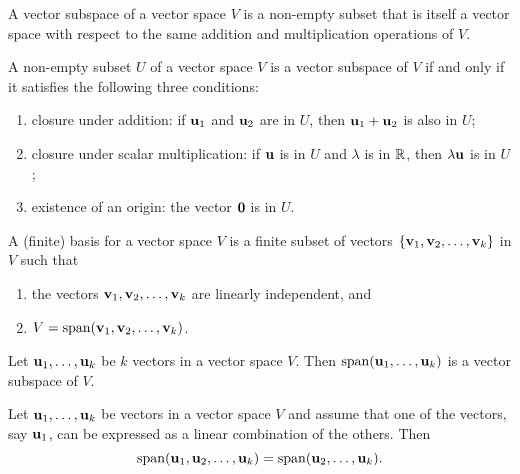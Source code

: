 \documentclass[10pt, a4paper]{article}
\begin{document}
\begin{definition}
    A vector subspace of a vector space $V$ is a non-empty subset that is itself a vector space with respect to the same addition and multiplication operations of $V$.
\end{definition}

\begin{proposition}
    A non-empty subset $U$ of a vector space $V$ is a vector subspace of $V$ if and only if it satisfies the following three conditions:
    \begin{enumerate}[label = (\roman*)]
        \item closure under addition:
        if $\mathbf{u}_1$ and $\mathbf{u}_2$ are in $U$,
        then $\mathbf{u}_1 + \mathbf{u}_2$ is also in $U$;
        \item closure under scalar multiplication:
        if $\mathbf{u}$ is in $U$ and $\lambda$ is in $\mathbb{R}$,
        then $\lambda\mathbf{u}$ is in $U$;
        \item existence of an origin:
        the vector $\mathbf{0}$ is in $U$.
    \end{enumerate}
\end{proposition}

\begin{definition}[Basis]
    A (finite) basis for a vector space $V$ is a finite subset of vectors $\{\mathbf{v}_1, \mathbf{v}_2, \dotsc, \mathbf{v}_k\}$ in $V$ such that
    \begin{enumerate}[label = (\roman*)]
        \item the vectors $\mathbf{v}_1, \mathbf{v}_2, \dotsc, \mathbf{v}_k$ are linearly independent,
        and
        \item $V = \mathrm{span}(\mathbf{v}_1, \mathbf{v}_2, \dotsc, \mathbf{v}_k)$.
    \end{enumerate}
\end{definition}

\begin{lemma}
    Let $\mathbf{u}_1, \dotsc, \mathbf{u}_k$ be $k$ vectors in a vector space $V$.
    Then $\mathrm{span}(\mathbf{u}_1, \dotsc, \mathbf{u}_k)$ is a vector subspace of $V$.
\end{lemma}

\begin{lemma}
    Let $\mathbf{u}_1, \dotsc, \mathbf{u}_k$ be vectors in a vector space $V$ and assume that one of the vectors,
    say $\mathbf{u}_1$,
    can be expressed as a linear combination of the others.
    Then
    \[
    \mathrm{span}(\mathbf{u}_1, \mathbf{u}_2, \dotsc, \mathbf{u}_k) = \mathrm{span}(\mathbf{u}_2, \dotsc, \mathbf{u}_k).
    \]
\end{lemma}
\end{document}
